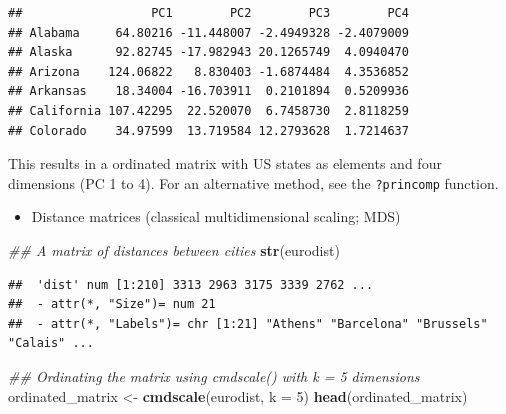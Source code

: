 \documentclass[
]{book}
\newenvironment{Shaded}{\begin{snugshade}}{\end{snugshade}}
\newcommand{\CommentTok}[1]{\textcolor[rgb]{0.56,0.35,0.01}{\textit{#1}}}
\newcommand{\DataTypeTok}[1]{\textcolor[rgb]{0.13,0.29,0.53}{#1}}
\newcommand{\DecValTok}[1]{\textcolor[rgb]{0.00,0.00,0.81}{#1}}
\newcommand{\KeywordTok}[1]{\textcolor[rgb]{0.13,0.29,0.53}{\textbf{#1}}}
\newcommand{\NormalTok}[1]{#1}
\newcommand{\OperatorTok}[1]{\textcolor[rgb]{0.81,0.36,0.00}{\textbf{#1}}}
\newcommand{\StringTok}[1]{\textcolor[rgb]{0.31,0.60,0.02}{#1}}
\providecommand{\tightlist}{%
  \setlength{\itemsep}{0pt}\setlength{\parskip}{0pt}}
\begin{document}
\begin{Shaded}
\end{Shaded}

\begin{verbatim}
##                  PC1        PC2        PC3        PC4
## Alabama     64.80216 -11.448007 -2.4949328 -2.4079009
## Alaska      92.82745 -17.982943 20.1265749  4.0940470
## Arizona    124.06822   8.830403 -1.6874484  4.3536852
## Arkansas    18.34004 -16.703911  0.2101894  0.5209936
## California 107.42295  22.520070  6.7458730  2.8118259
## Colorado    34.97599  13.719584 12.2793628  1.7214637
\end{verbatim}

This results in a ordinated matrix with US states as elements and four dimensions (PC 1 to 4). For an alternative method, see the \texttt{?princomp} function.

\begin{itemize}
\tightlist
\item
  Distance matrices (classical multidimensional scaling; MDS)
\end{itemize}

\begin{Shaded}
\begin{Highlighting}[]
\CommentTok{\#\# A matrix of distances between cities}
\KeywordTok{str}\NormalTok{(eurodist)}
\end{Highlighting}
\end{Shaded}

\begin{verbatim}
##  'dist' num [1:210] 3313 2963 3175 3339 2762 ...
##  - attr(*, "Size")= num 21
##  - attr(*, "Labels")= chr [1:21] "Athens" "Barcelona" "Brussels" "Calais" ...
\end{verbatim}

\begin{Shaded}
\begin{Highlighting}[]
\CommentTok{\#\# Ordinating the matrix using cmdscale() with k = 5 dimensions }
\NormalTok{ordinated\_matrix \textless{}{-}}\StringTok{ }\KeywordTok{cmdscale}\NormalTok{(eurodist, }\DataTypeTok{k =} \DecValTok{5}\NormalTok{)}
\KeywordTok{head}\NormalTok{(ordinated\_matrix)}
\end{Highlighting}
\end{Shaded}
\end{document}
